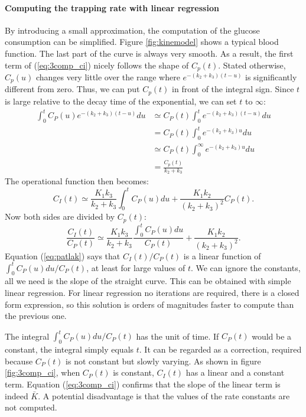 \documentclass[11pt,oneside]{book}
\begin{document}
\paragraph{Computing the trapping rate with linear regression\\}
By introducing a small approximation, the computation of the glucose
consumption can be simplified. Figure \ref{fig:kinemodel} shows a typical
blood function. The last part of the curve is always very smooth. As a result,
the first term of (\ref{eq:3comp_ci}) nicely follows the shape of
$C_p(t)$. Stated otherwise, $C_p(u)$ changes very little over the range where
$e^{-(k_2 + k_3)(t - u)}$ is significantly different from zero. Thus, we can
put $C_p(t)$ in front of the integral sign. Since $t$ is large relative to the
decay time of the exponential, we can set $t$ to $\infty$:
\begin{align}
\int_0^t C_P(u) e^{-(k_2 + k_3)(t - u)}du
  &\simeq  C_P(t) \int_0^t  e^{-(k_2 + k_3)(t - u)}du\\
  &=       C_P(t) \int_0^t  e^{-(k_2 + k_3)u}du\\
  &\simeq  C_P(t) \int_0^\infty  e^{-(k_2 + k_3)u}du\\
  &= \frac{C_p(t)}{k_2 + k_3}
\end{align}
The operational function then becomes:
\begin{equation}
  C_I(t) \simeq \frac{K_1 k_3}{k_2 + k_3} \int_0^t C_P(u) du + 
  \frac{K_1 k_2}{(k_2 + k_3)^2} C_P(t).
\end{equation}
Now both sides are divided by $C_p(t)$:
\begin{equation}
  \frac{C_I(t)}{C_P(t)} \simeq 
    \frac{K_1 k_3}{k_2 + k_3} \frac{\int_0^t C_P(u) du}{C_P(t)} + 
  \frac{K_1 k_2}{(k_2 + k_3)^2}. \label{eq:patlak}
\end{equation}
Equation (\ref{eq:patlak}) says that $C_I(t)/C_P(t)$ is a linear function of
$\int_0^t C_P(u) du / C_P(t)$, at least for large values of $t$. We can ignore
the constants, all we need is the slope of the straight curve. This can be
obtained with simple linear regression. For linear regression no iterations
are required, there is a closed form expression, so this solution is orders of
magnitudes faster to compute than the previous one. 

The integral $\int_0^t C_P(u) du / C_P(t)$ has the unit of time. If $C_P(t)$
would be a constant, the integral simply equals $t$. It can be regarded as a
correction, required because $C_P(t)$ is not constant but slowly varying. As
shown in figure \ref{fig:3comp_ci}, when $C_P(t)$ is constant, $C_I(t)$ has
a linear and a constant term. Equation (\ref{eq:3comp_ci}) confirms that the
slope of the linear term is indeed $\bar{K}$. A potential disadvantage is that
the values of the rate constants are not computed.
\end{document}
